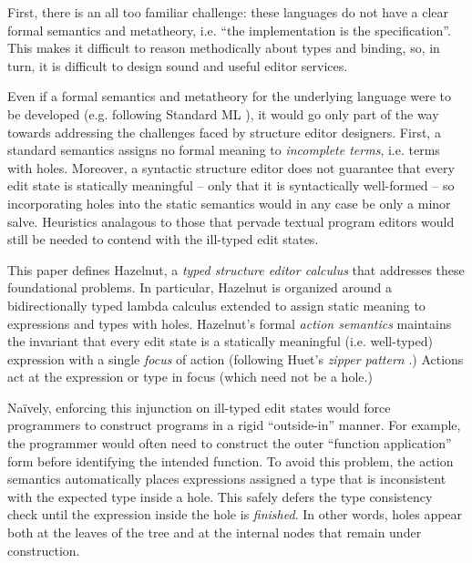 First, there is an all too familiar challenge: these languages do not have a clear formal semantics and metatheory, i.e. ``the implementation is the specification''. This makes it difficult to reason methodically about types and binding, so, in turn, it is difficult to design sound and useful editor services.

Even if a formal semantics and metatheory for the underlying language were to be developed (e.g. following Standard ML \cite{Harper00atype-theoretic,mthm97-for-dart}), it would go only part of the way towards addressing the challenges faced by structure editor designers. First, a standard semantics assigns no formal meaning to \emph{incomplete terms}, i.e. terms with holes. Moreover, a syntactic structure editor does not guarantee that every edit state is statically meaningful -- only that it is syntactically well-formed -- so incorporating holes into the static semantics would in any case be only a minor salve. Heuristics analagous to those that pervade textual program editors would still be needed to contend with the ill-typed edit states.

This paper defines Hazelnut,  a \emph{typed structure editor calculus} that addresses these foundational problems. 
In particular, Hazelnut is organized around a bidirectionally typed lambda calculus extended to assign static meaning to expressions and types with {holes}. Hazelnut's formal \emph{action semantics} maintains the invariant that every edit state is a statically meaningful (i.e. well-typed) expression with a single \emph{focus} of action (following Huet's \emph{zipper pattern} \cite{JFP::Huet1997}.) Actions act at the expression or type in focus (which need not be a hole.)  %

Na\"ively, enforcing this injunction on ill-typed edit states would force programmers to construct programs in a rigid ``outside-in'' manner. For example, the programmer would often need to construct the outer ``function application'' form before identifying the intended function. To avoid this problem, the action semantics automatically places expressions assigned a type that is inconsistent with the expected type inside a {hole}. This safely defers the type consistency check until the expression inside the hole is \emph{finished}. In other words, holes appear both at the leaves of the tree and at the internal nodes that remain under construction. %


